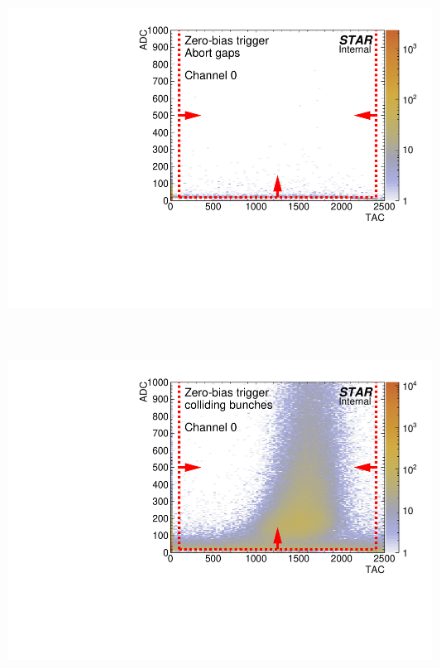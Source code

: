 \begin{figure}[t]\ContinuedFloat
\centering
\parbox{0.495\textwidth}{
  \centering
  \includegraphics[width=\linewidth,page=40]{graphics/eventSelection/bbc/Bbc_ADCvsTAC_abortGaps.pdf}
}~
\parbox{0.495\textwidth}{
  \centering
  \includegraphics[width=\linewidth,page=40]{graphics/eventSelection/bbc/Bbc_ADCvsTAC_collidingBunches.pdf}
}%
\end{figure}





